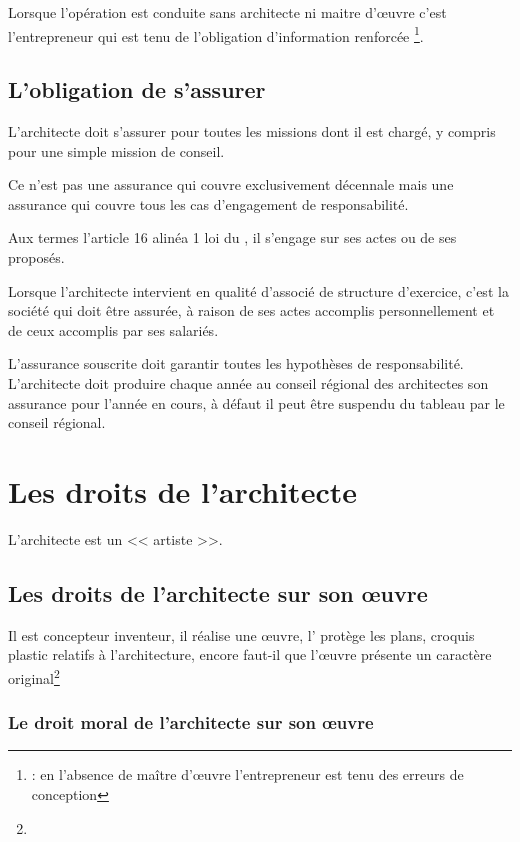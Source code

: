 		Lorsque l’opération est conduite sans architecte ni maitre d’œuvre c’est l’entrepreneur qui est tenu de l’obligation d’information renforcée
		\footnote{ : en l’absence de maître d’œuvre l’entrepreneur est tenu des erreurs de conception}.



	\subsection{L'obligation de s'assurer}

		L’architecte doit s’assurer pour toutes les missions dont il est chargé, y compris pour une simple mission de conseil.


		Ce n’est pas une assurance qui couvre exclusivement décennale mais une assurance qui couvre tous les cas d’engagement de responsabilité.


		Aux termes l'article 16 alinéa 1 loi du , il s’engage sur ses actes ou de ses proposés.

		Lorsque l’architecte intervient en qualité d’associé de structure d’exercice, c’est la société qui doit être assurée, à raison de ses actes accomplis personnellement et de ceux accomplis par ses salariés.


		L’assurance souscrite doit garantir toutes les hypothèses de responsabilité. L’architecte doit produire chaque année au conseil régional des architectes son assurance pour l’année en cours, à défaut il peut être suspendu du tableau par le conseil régional.



\section{Les droits de l'architecte}

	L'architecte est un << artiste >>.

	\subsection{Les droits de l'architecte sur son œuvre}

		Il est concepteur inventeur, il réalise une œuvre, l' protège les plans, croquis plastic relatifs à l’architecture, encore faut-il que l’œuvre présente un caractère original\footnote{}

		\subsubsection{Le droit moral de l'architecte sur son œuvre}

